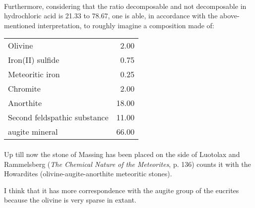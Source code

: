 \documentclass[a4paper, 12pt, oneside]{article}
\begin{document}
\paragraph*{}
Furthermore, considering that the ratio decomposable and not decomposable in hydrochloric acid is 21.33 to 78.67, one is able, in accordance with the above-mentioned interpretation, to roughly imagine a composition made of: 
\begin{center}
    \begin{tabular}{l r}
        Olivine & 2.00\\
        Iron(II) sulfide & 0.75\\
        Meteoritic iron & 0.25\\
        Chromite & 2.00\\
        Anorthite & 18.00\\
        Second feldspathic substance & 11.00\\
        augite\index{augite} mineral & 66.00\\
    \end{tabular}
\end{center}
\paragraph*{}
Up till now the stone of Massing has been placed on the side of Luotolax and Rammelsberg (\emph{The Chemical Nature of the Meteorites}, p. 136) counts it with the Howardites (olivine-augite-anorthite meteoritic stones).

I think that it has more correspondence with the augite group of the eucrites because the olivine is very sparse in extant.
\end{document}
